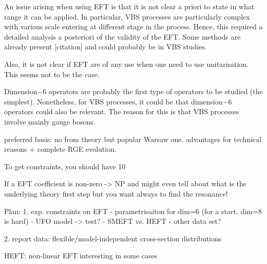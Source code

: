 An issue arising when using EFT is that it is not clear a priori to state in what range it can be applied.
In particular, VBS processes are particularly complex with various scale entering at different stage in the process.
Hence, this required a detailed analysis a posteriori of the validity of the EFT.
Some methods are already present [citation] and could probably be in VBS studies.

Also, it is not clear if EFT are of any use when one need to use unitarisation.
This seems not to be the case.

Dimension$-6$ operators are probably the first type of operators to be studied (the simplest).
Nonetheless, for VBS processes, it could be that dimension$-6$ operators could also be relevant.
The reason for this is that VBS processes involve mainly gauge bosons.



preferred basis: no from theory but popular Warsaw one.
advantages for technical reasons + complete RGE evolution.

To get constraints, you should have 10%

If a EFT coefficient is non-zero -> NP and might even tell about what is the underlying theory
first step but you want always to find the resonance!

Plan:
1. exp. constraints on EFT
- parametrisaiton for dim=6 (for a start, dim=8 is hard)
- UFO model -> test?
- SMEFT vs. HEFT
- other data set?

2. report data: flexible/model-independent
cross-section
distributions

HEFT: non-linear EFT
interesting in some cases
